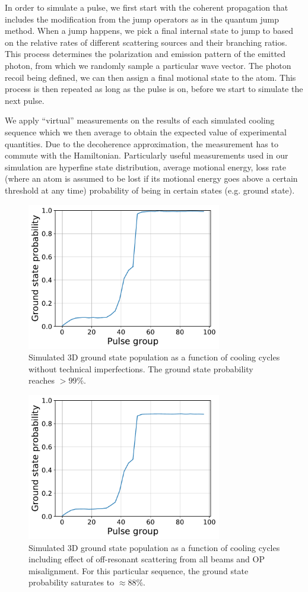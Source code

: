 \documentclass[aps,secnumarabic,amsmath,amssymb]{revtex4}
\begin{document}
In order to simulate a pulse, we first start with the coherent propagation that includes the
modification from the jump operators as in the quantum jump method.
When a jump happens, we pick a final internal state to jump to based on the relative rates
of different scattering sources and their branching ratios.
This process determines the polarization and emission pattern of the emitted photon,
from which we randomly sample a particular wave vector.
The photon recoil being defined, we can then assign a final motional state to the atom.
This process is then repeated as long as the pulse is on,
before we start to simulate the next pulse.

We apply ``virtual'' measurements on the results of each simulated cooling sequence
which we then average to obtain the expected value of experimental quantities.
Due to the decoherence approximation, the measurement has to commute with the Hamiltonian.
Particularly useful measurements used in our simulation are hyperfine state distribution,
average motional energy, loss rate (where an atom is assumed to be lost if its motional energy
goes above a certain threshold at any time) probability of being in certain states
(e.g. ground state).

\begin{figure}[t]
  \includegraphics[width=8.5cm]{imgs/simcool_no_scatter.pdf}
  \caption{Simulated 3D ground state population as a function of cooling cycles without
    technical imperfections. The ground state probability reaches $>99\%$. \label{f-no-scatter}}
\end{figure}
\begin{figure}[t]
  \includegraphics[width=8.5cm]{imgs/simcool_real.pdf}
  \caption{Simulated 3D ground state population as a function of cooling cycles including effect of
    off-resonant scattering from all beams and OP misalignment.
    For this particular sequence, the ground state probability saturates to $\approx88\%$.
    \label{f-real}}
\end{figure}
\end{document}

